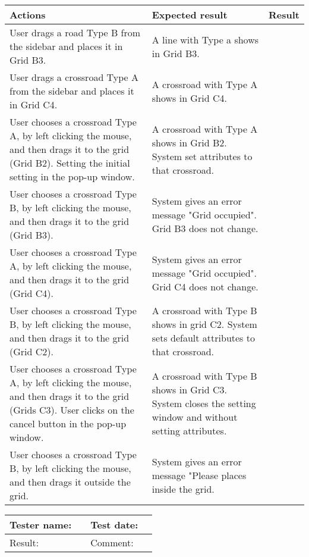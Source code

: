 	\begin{tabularx}{\textwidth}{|X|X|p{2.5cm}|}\hline
		Actions & Expected result & Result \\\hline

		User drags a road Type B from the sidebar and places it in Grid B3. & A line with Type a shows in Grid B3. & \pass \\\hline
		User drags a crossroad Type A from the sidebar and places it in Grid C4. & A crossroad with Type A shows in Grid C4. & \pass \\\hline
		User chooses a crossroad Type A, by left clicking the mouse, and then drags it to the grid (Grid B2). Setting the initial setting in the pop-up window. & A crossroad with Type A shows in Grid B2. System set attributes to that crossroad. & \pass \\\hline
		User chooses a crossroad Type B, by left clicking the mouse, and then drags it to the grid (Grid B3). & System gives an  error message "Grid occupied". Grid B3 does not change. & \pass\\\hline
		User chooses a crossroad Type A, by left clicking the mouse, and then drags it to the grid (Grid C4). & System gives an  error message "Grid occupied". Grid C4 does not change. & \pass\\\hline
	    User chooses a crossroad Type B, by left clicking the mouse, and then drags it to the grid (Grid C2). & A crossroad with Type B shows in grid C2. System sets default attributes to that crossroad. & \pass\\\hline
	    User chooses a crossroad Type A, by left clicking the mouse, and then drags it to the grid (Grids C3). User clicks on the cancel button in the pop-up window. & A crossroad with Type B shows in Grid C3. System closes the setting window and without setting attributes. & \pass\\\hline
	    User chooses a crossroad Type B, by left clicking the mouse, and then drags it outside the grid.& System gives an error message "Please places inside the grid. & \pass\\\hline
	     
	\end{tabularx}


\begin{tabularx}{\textwidth}{|p{3cm}X|p{3cm}X|}\hline
	Tester name: &  & Test date: & \\\hline
	Result: &   \pass & Comment: & \\\hline
\end{tabularx}

